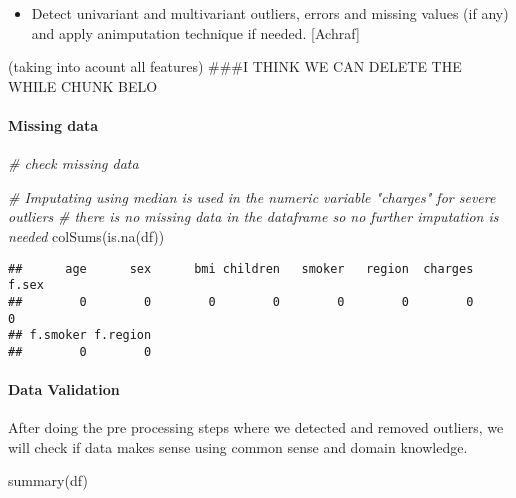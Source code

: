 \documentclass[
]{article}
\newenvironment{Shaded}{\begin{snugshade}}{\end{snugshade}}
\newcommand{\CommentTok}[1]{\textcolor[rgb]{0.56,0.35,0.01}{\textit{#1}}}
\newcommand{\FunctionTok}[1]{\textcolor[rgb]{0.00,0.00,0.00}{#1}}
\newcommand{\NormalTok}[1]{#1}
\providecommand{\tightlist}{%
  \setlength{\itemsep}{0pt}\setlength{\parskip}{0pt}}
\begin{document}
\begin{itemize}
\tightlist
\item
  Detect univariant and multivariant outliers, errors and missing values
  (if any) and apply animputation technique if needed. {[}Achraf{]}
\end{itemize}

(taking into acount all features) \#\#\#I THINK WE CAN DELETE THE WHILE
CHUNK BELO

\hypertarget{missing-data}{%
\paragraph{Missing data}\label{missing-data}}

\begin{Shaded}
\begin{Highlighting}[]
\CommentTok{\# check missing data}

\CommentTok{\# Imputating using median is used in the numeric variable "charges" for severe outliers}
\CommentTok{\# there is no missing data in the dataframe so no further imputation is needed }
\FunctionTok{colSums}\NormalTok{(}\FunctionTok{is.na}\NormalTok{(df))}
\end{Highlighting}
\end{Shaded}

\begin{verbatim}
##      age      sex      bmi children   smoker   region  charges    f.sex 
##        0        0        0        0        0        0        0        0 
## f.smoker f.region 
##        0        0
\end{verbatim}

\hypertarget{data-validation}{%
\paragraph{Data Validation}\label{data-validation}}

After doing the pre processing steps where we detected and removed
outliers, we will check if data makes sense using common sense and
domain knowledge.

\begin{Shaded}
\begin{Highlighting}[]
\FunctionTok{summary}\NormalTok{(df)}
\end{Highlighting}
\end{Shaded}
\end{document}
